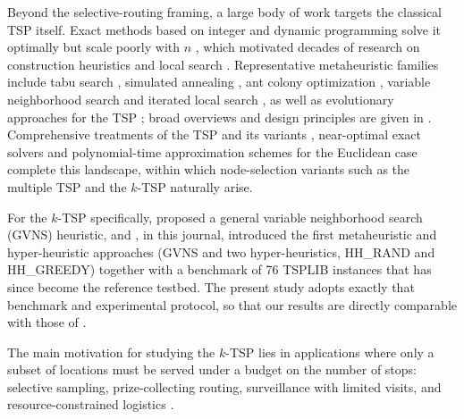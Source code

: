 \documentclass[sn-chicago]{sn-jnl}
\begin{document}
Beyond the selective-routing framing, a large body of work targets the classical
TSP itself. Exact methods based on integer and dynamic programming solve it
optimally but scale poorly with $n$ \citep{dantzig1954,bellman1962,heldkarp1962,karp1972},
which motivated decades of research on construction heuristics and local search
\citep{lin1965,christofides1976,bentley1992,johnson1997,laporte1992}. Representative
metaheuristic families include tabu search \citep{glover1986,gloverlaguna1997,knox1994},
simulated annealing \citep{cerny1985}, ant colony optimization \citep{dorigo1997acs},
variable neighborhood search \citep{mladenovic1997vns} and iterated local search
\citep{martin1991}, as well as evolutionary approaches for the TSP
\citep{potvin1996}; broad overviews and design principles are given in
\citep{blumroli2003,talbi2009}. Comprehensive treatments of the TSP and its
variants \citep{gutin2007book}, near-optimal exact solvers
\citep{applegate2006concorde} and polynomial-time approximation schemes for the
Euclidean case \citep{arora1998} complete this landscape, within which
node-selection variants such as the multiple TSP \citep{bektas2006} and the $k$-TSP
naturally arise.

For the $k$-TSP specifically, \citet{venkatesh2018} proposed a general variable
neighborhood search (GVNS) heuristic, and \citet{pandiri2020}, in this journal,
introduced the first metaheuristic and hyper-heuristic approaches (GVNS and two
hyper-heuristics, HH\_RAND and HH\_GREEDY) together with a benchmark of 76 TSPLIB
instances that has since become the reference testbed. The present study adopts
exactly that benchmark and experimental protocol, so that our results are directly
comparable with those of \citet{pandiri2020}.

The main motivation for studying the $k$-TSP lies in applications where only a
subset of locations must be served under a budget on the number of stops:
selective sampling, prize-collecting routing, surveillance with limited visits,
and resource-constrained logistics \citep{vansteenwegen2011top,blanchard2023}.
\end{document}
